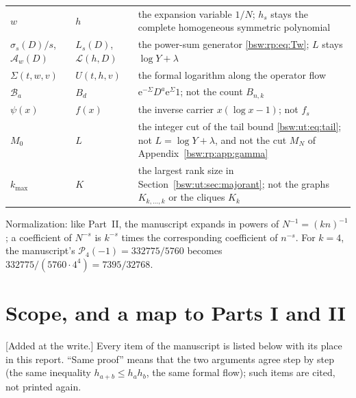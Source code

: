 \documentclass[11pt,letterpaper]{article}
\theoremstyle{definition}
\theoremstyle{remark}
\newcommand{\ee}{\mathrm e}
\begin{document}
\begin{center}
\begin{tabular}{>{\raggedright\arraybackslash}p{}>{\raggedright\arraybackslash}p{}>{\raggedright\arraybackslash}p{}}
$w$ & $h$ & the expansion variable $1/N$; $h_s$ stays the complete
 homogeneous symmetric polynomial\\
$\sigma_s(D)/s$, $\mathcal A_w(D)$ & $L_s(D)$, $\mathcal L(h,D)$ & the
 power-sum generator \eqref{bsw:rp:eq:Tw}; $L$ stays $\log Y+\lambda$\\
$\Sigma(t,w,v)$ & $U(t,h,v)$ & the formal logarithm along the operator flow\\
$\mathcal B_a$ & $B_d$ & $\ee^{-\Sigma}D^a\ee^{\Sigma}1$; not the count
 $B_{n,k}$\\
$\psi(x)$ & $f(x)$ & the inverse carrier $x(\log x-1)$; not $f_s$\\
$M_0$ & $L$ & the integer cut of the tail bound \eqref{bsw:ut:eq:tail};
 not $L=\log Y+\lambda$, and not the cut $M_N$ of
 Appendix~\ref{bsw:rp:app:gamma}\\
$k_{\max}$ & $K$ & the largest rank size in
 Section~\ref{bsw:ut:sec:majorant}; not the graphs $K_{k,\ldots,k}$ or
 the cliques $K_k$\\
\bottomrule
\end{tabular}
\end{center}

Normalization: like Part~II, the manuscript expands in powers of
$N^{-1}=(kn)^{-1}$; a coefficient of $N^{-s}$ is $k^{-s}$ times the
corresponding coefficient of $n^{-s}$.  For $k=4$, the manuscript's
$\mathcal P_4(-1)=332775/5760$ becomes $332775/(5760\cdot4^4)=7395/32768$.

\section{Scope, and a map to Parts I and II}\label{bsw:ut:sec:map}

[Added at the write.]  Every item of the manuscript is listed below with
its place in this report.  ``Same proof'' means that the two arguments agree
step by step (the same inequality $h_{a+b}\le h_ah_b$, the same formal
flow); such items are cited, not printed again.
\end{document}
